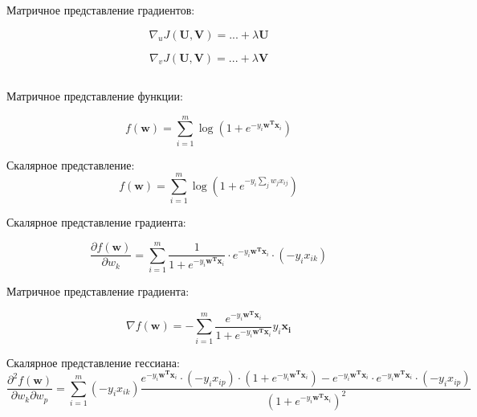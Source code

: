	Матричное представление градиентов:
	
	
	\begin{equation}
	\nabla_u J(\mathbf{U}, \mathbf{V}) = ... + \lambda \mathbf{U}
	\end{equation}
	
	
	\begin{equation}
	\nabla_v J(\mathbf{U}, \mathbf{V}) = ...+ \lambda \mathbf{V}
	\end{equation}
	
	\subsection{}
	
	
	Матричное представление функции:
	
	\begin{equation}
	f(\mathbf{w}) = \sum\limits_{i=1}^m \log (1+ e^{-y_i \mathbf{w^T x}_i})
	\end{equation}
	
	Скалярное представление:	
	\begin{equation}
	f(\mathbf{w}) = \sum\limits_{i=1}^m \log (1+ e^{-y_i \sum_j w_j x_{ij}})
	\end{equation}
	
	Скалярное представление градиента:
	
	\begin{equation}
	\frac{\partial f(\mathbf{w})}{\partial w_k} = \sum\limits_{i=1}^m  \frac{1}{1+
		e^{-y_i \mathbf{w^T x}_i}} \cdot e^{-y_i \mathbf{w^T x}_i} \cdot (-y_i x_{ik})
	\end{equation}
	
	Матричное представление градиента:
	
	\begin{equation}
	\nabla f(\mathbf{w}) = - \sum\limits_{i=1}^m  \frac{e^{-y_i \mathbf{w^T
				x}_i}}{1+ e^{-y_i \mathbf{w^T x}_i}} y_i\mathbf{x_i}
	\end{equation}
	
	Скалярное представление гессиана:
	\begin{equation}
	\frac{\partial^2 f(\mathbf{w})}{\partial w_k \partial w_p} =
	\sum\limits_{i=1}^m (-y_i x_{ik})  \frac{e^{-y_i \mathbf{w^T x}_i}\cdot(-y_i
		x_{ip})\cdot(1+e^{-y_i \mathbf{w^T x}_i})-e^{-y_i \mathbf{w^T x}_i}\cdot e^{-y_i
			\mathbf{w^T x}_i}\cdot(-y_i x_{ip})}{(1+e^{-y_i \mathbf{w^T x}_i})^2} 
	\end{equation}
	

